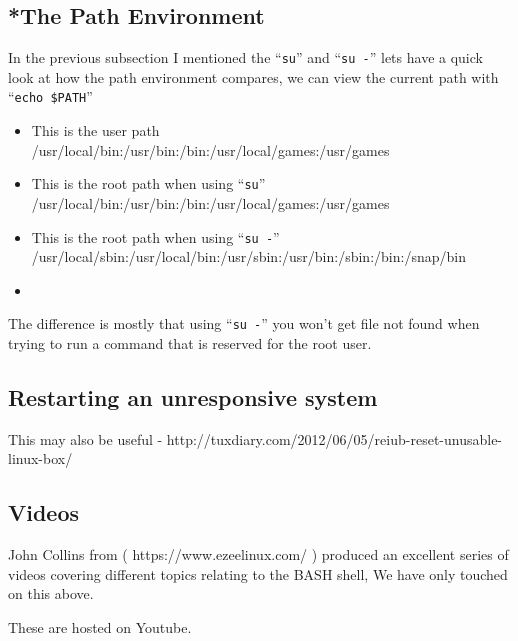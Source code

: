 \documentclass{extbook}
\begin{document}
\subsection{*The Path Environment}
 In the previous subsection I mentioned the ``\verb|su|'' and ``\verb|su -|'' lets have a quick look at how the path environment compares,  we can view the current path with ``\verb|echo $PATH|''
\begin{itemize}
\item This is the user path /usr/local/bin:/usr/bin:/bin:/usr/local/games:/usr/games
\item This is the root path when using ``\verb|su|'' /usr/local/bin:/usr/bin:/bin:/usr/local/games:/usr/games
\item This is the root path when using ``\verb|su -|'' /usr/local/sbin:/usr/local/bin:/usr/sbin:/usr/bin:/sbin:/bin:/snap/bin
\item 
\end{itemize}

The difference is mostly that using ``\verb|su -|'' you won't get file not found when trying to run a command that is reserved for the root user. 

\subsection{Restarting an unresponsive system}

This may also be useful - http://tuxdiary.com/2012/06/05/reiub-reset-unusable-linux-box/

\subsection{Videos}

John Collins from ( https://www.ezeelinux.com/ ) produced an excellent series of videos covering different topics relating to the BASH shell,  We have only touched on this above.

These are hosted on Youtube.
\end{document}

